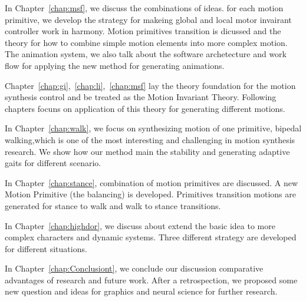 In Chapter~\ref{chap:msf}, we discuss the combinations of ideas.
for each motion primitive, we develop the strategy for makeing global and local motor invairant controller work in harmony.
Motion primitives transition is dicussed and the theory for how to combine simple motion elements into more complex motion.
The animation system, we also talk about the software archetecture and work flow for applying the new method for generating animations.

Chapter~\ref{chap:gi},~\ref{chap:li},~\ref{chap:msf} lay the theory foundation for the motion synthesis control and be treated as the Motion Invariant Theory.
Following chapters focuns on application of this theory for generating different motions.



In Chapter~\ref{chap:walk}, we focus on synthesizing motion of one primitive, bipedal walking,which is one of the most interesting and challenging  in motion synthesis research.
We show how our method main the stability and generating adaptive gaits for different scenario.


In Chapter~\ref{chap:stance}, combination of motion primitives are discussed.
A new Motion Primitive (the balancing) is developed. 
Primitives transition motions are generated for stance to walk and walk to stance transitions.

In Chapter~\ref{chap:highdor}, we discuss about extend the basic idea to more complex characters and dynamic systems.
Three different strategy are developed for different situations.

In Chapter~\ref{chap:Conclusiont}, we conclude our discussion comparative advantages of research and future work.
After a retrospection, we proposed some new question and ideas for graphics and neural science for further research.








